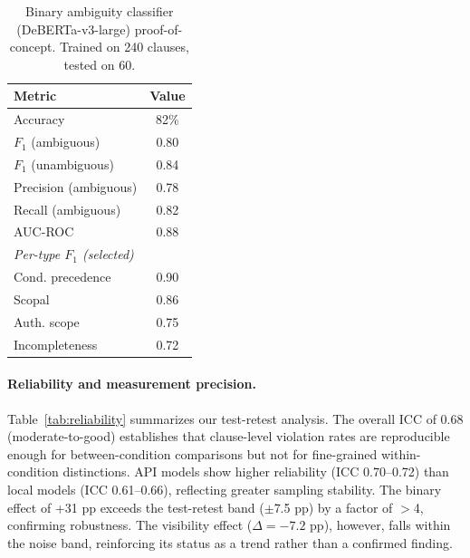 \documentclass[11pt,a4paper]{article}
\begin{document}
\begin{table}[t]
\centering
\small
\caption{Binary ambiguity classifier (DeBERTa-v3-large) proof-of-concept. Trained on 240 clauses, tested on 60.}
\label{tab:classifier}
\begin{tabular}{lc}
\toprule
\textbf{Metric} & \textbf{Value} \\
\midrule
Accuracy & 82\% \\
$F_1$ (ambiguous) & 0.80 \\
$F_1$ (unambiguous) & 0.84 \\
Precision (ambiguous) & 0.78 \\
Recall (ambiguous) & 0.82 \\
AUC-ROC & 0.88 \\
\midrule
\multicolumn{2}{l}{\emph{Per-type $F_1$ (selected)}} \\
\quad Cond. precedence & 0.90 \\
\quad Scopal & 0.86 \\
\quad Auth. scope & 0.75 \\
\quad Incompleteness & 0.72 \\
\bottomrule
\end{tabular}
\end{table}


\paragraph{Reliability and measurement precision.}
Table~\ref{tab:reliability} summarizes our test-retest analysis. The overall ICC of 0.68 (moderate-to-good) establishes that clause-level violation rates are reproducible enough for between-condition comparisons but not for fine-grained within-condition distinctions. API models show higher reliability (ICC 0.70--0.72) than local models (ICC 0.61--0.66), reflecting greater sampling stability. The binary effect of +31 pp exceeds the test-retest band ($\pm$7.5 pp) by a factor of $>$4, confirming robustness. The visibility effect ($\Delta = -7.2$ pp), however, falls within the noise band, reinforcing its status as a trend rather than a confirmed finding.
\end{document}
